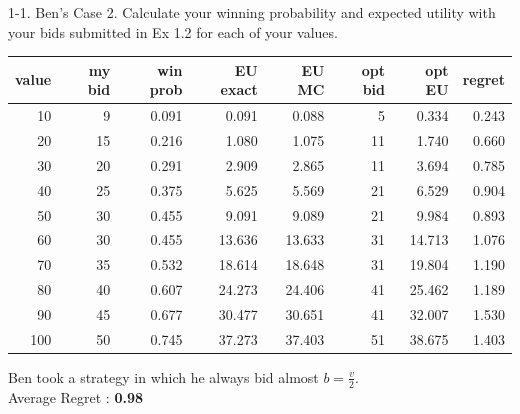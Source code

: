 \documentclass{beamer}
\begin{document}
\begin{frame}{1-1. Ben's Case}
2. Calculate your winning probability and expected utility with your bids submitted in Ex 1.2 for each of your values.
\begin{center}
\small
\begin{tabular}{@{}rrrrrrrr@{}}
\toprule
value & my bid & win prob & EU exact & EU MC & opt bid & opt EU & regret \\
\midrule
 10 &   9 & 0.091 & 0.091 & 0.088 &  5 & 0.334 & 0.243 \\
 20 &  15 & 0.216 & 1.080 & 1.075 & 11 & 1.740 & 0.660 \\
 30 &  20 & 0.291 & 2.909 & 2.865 & 11 & 3.694 & 0.785 \\
 40 &  25 & 0.375 & 5.625 & 5.569 & 21 & 6.529 & 0.904 \\
 50 &  30 & 0.455 & 9.091 & 9.089 & 21 & 9.984 & 0.893 \\
 60 &  30 & 0.455 &13.636 &13.633 & 31 &14.713 & 1.076 \\
 70 &  35 & 0.532 &18.614 &18.648 & 31 &19.804 & 1.190 \\
 80 &  40 & 0.607 &24.273 &24.406 & 41 &25.462 & 1.189 \\
 90 &  45 & 0.677 &30.477 &30.651 & 41 &32.007 & 1.530 \\
100 &  50 & 0.745 &37.273 &37.403 & 51 &38.675 & 1.403 \\
\bottomrule
\end{tabular}
\end{center}
Ben took a strategy in which he always bid almost \(b=\frac{v}{2}\).\\
Average Regret : \textbf{0.98}
\end{frame}

\end{document}
